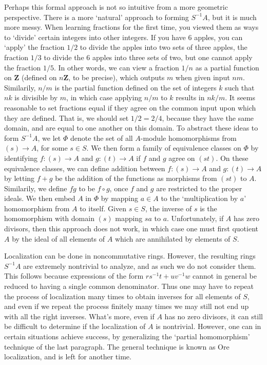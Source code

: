 Perhaps this formal approach is not so intuitive from a more geometric perspective. There is a more `natural' approach to forming $S^{-1}A$, but it is much more messy. When learning fractions for the first time, you viewed them as ways to `divide' certain integers into other integers. If you have 6 apples, you can `apply' the fraction $1/2$ to divide the apples into two sets of three apples, the fraction $1/3$ to divide the 6 apples into three sets of two, but one cannot apply the fraction $1/5$. In other words, we can view a fraction $1/n$ as a partial function on $\mathbf{Z}$ (defined on $n \mathbf{Z}$, to be precise), which outputs $m$ when given input $nm$. Similarily, $n/m$ is the partial function defined on the set of integers $k$ such that $nk$ is divisible by $m$, in which case applying $n/m$ to $k$ results in $nk/m$. It seems reasonable to set fractions equal if they agree on the common input upon which they are defined. That is, we should set $1/2 = 2/4$, because they have the same domain, and are equal to one another on this domain. To abstract these ideas to form $S^{-1}A$, we let $\Phi$ denote the set of all $A$-module homomorphisms from $(s) \to A$, for some $s \in S$. We then form a family of equivalence classes on $\Phi$ by identifying $f: (s) \to A$ and $g: (t) \to A$ if $f$ and $g$ agree on $(st)$. On these equivalence classes, we can define addition between $f: (s) \to A$ and $g: (t) \to A$ by letting $f + g$ be the addition of the functions as morphisms from $(st)$ to $A$. Similarily, we define $fg$ to be $f \circ g$, once $f$ and $g$ are restricted to the proper ideals. We then embed $A$ in $\Phi$ by mapping $a \in A$ to the `multiplication by $a$' homomorphism from $A$ to itself. Given $s \in S$, the inverse of $s$ is the homomorphism with domain $(s)$ mapping $sa$ to $a$. Unfortunately, if $A$ has zero divisors, then this approach does not work, in which case one must first quotient $A$ by the ideal of all elements of $A$ which are annihilated by elements of $S$.

\begin{remark}
Localization can be done in noncommutative rings. However, the resulting rings $S^{-1}A$ are extremely nontrivial to analyze, and as such we do not consider them. This follows because expressions of the form $rs^{-1}t + uv^{-1}w$ cannot in general be reduced to having a single common denominator. Thus one may have to repeat the process of localization many times to obtain inverses for all elements of $S$, and even if we repeat the process finitely many times we may still not end up with all the right inverses. What's more, even if $A$ has no zero divisors, it can still be difficult to determine if the localization of $A$ is nontrivial. However, one can in certain situations achieve success, by generalizing the `partial homomorphism' technique of the last paragraph. The general technique is known as Ore localization, and is left for another time.
\end{remark}

